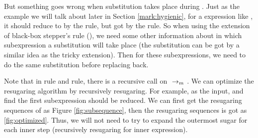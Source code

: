 {\begin{center}
\end{center}

But something goes wrong when substitution takes place during . Just as the example we will talk about later in Section \ref{mark:hygienic}, for a expression like , it should reduce to  by the  rule, but got  by the  rule. So when using the extension of black-box stepper's rule (), we need some other information about in which subexpression a substitution will take place (the substitution can be got by a similar idea as the tricky extension). Then for these subexpressions, we need to do the same substitution before replacing back.
}



\label{mark:optimize}
Note that in  rule and  rule, there is a recursive call on $~\rightarrow_m~$. We can optimize the resugaring algorithm by recursively resugaring. For example,  as the input, and find the first subexpression should be reduced. We can first get the resugaring sequences of  as Figure \ref{fig:subsequence}, then the resugaring sequences is got as \ref{fig:optimized}. Thus, we will not need to try to expand the outermost sugar for each inner step (recursively resugaring for inner expression).


